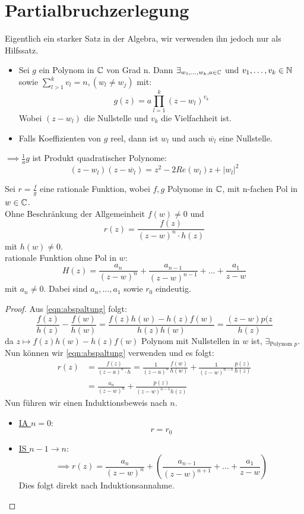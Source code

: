 \section{Partialbruchzerlegung}
\begin{lemma}
Eigentlich ein starker Satz in der Algebra, wir verwenden ihn jedoch nur als Hilfssatz.

\begin{itemize}
	\item Sei $g$ ein Polynom in $\mathbb{C}$  von Grad n. Dann $\exists_{w_1,\ldots,w_k,a \in \mathbb{C}} $ und $v_1,\ldots,v_k \in \mathbb{N}$ sowie $\sum_{l>1}^{k}v_l=n, (w_l \neq w_j)$ mit:
		\[
			g(z) = a \prod_{l=1}^{k} (z-w_l)^{v_k}
		\]
		Wobei $(z-w_l)$ die Nullstelle und $v_k$ die Vielfachheit ist.   
	\item Falls Koeffizienten von $g$ reel, dann ist $w_l$ und auch $\overline{w_l}$ eine Nullstelle. 
\end{itemize}
$\implies \frac{1}{a}g$ ist Produkt quadratischer Polynome:
\[
	(z-w_l)(z-\overline{w_l})= z^2 -2Re(w_l)z + |w_l|^2
\]
\end{lemma}
\begin{lemma}
Sei $r=\frac{f}{g}$ eine rationale Funktion, wobei $f,g$ Polynome in $\mathbb{C}$, mit n-fachen Pol in $w \in \mathbb{C}$.\\
Ohne Beschränkung der Allgemeinheit $f(w)\neq 0$ und
\begin{equation}
	\label{eqn:abspaltung}
	r(z) = \frac{f(z)}{(z-w)^n \cdot h(z)}
\end{equation}
mit $h(w)\neq 0$. \\rationale Funktion ohne Pol in $w$:
\[
	H(z) = \frac{a_n}{(z-w)^n}+ \frac{a_{n-1}}{(z-w)^{n-1}}+\ldots+\frac{a_1}{z-w}
\]
mit $a_n\neq 0$. Dabei sind $a_n,\ldots,a_1$ sowie $r_0$ eindeutig. 
\end{lemma}
\begin{proof}
	Aus \eqref{eqn:abspaltung} folgt:
	\[
	\frac{f(z)}{h(z)}-\frac{f(w)}{h(w)}=\frac{f(z)h(w)-h(z)f(w)}{h(z)h(w)}= \frac{(z-w)p(z}{h(z)}
	\]
	da $z \mapsto f(z)h(w)-h(z)f(w)$ Polynom mit Nullstellen in $w$ ist, $\exists_{\text{Polynom } p}$. 
Nun können wir \eqref{eqn:abspaltung} verwenden und es folgt:
\begin{align*}
	r(z)&= \frac{f(z)}{(z-a)^n \cdot h}= \frac{1}{(z-a)^n}\frac{f(w)}{h(w)}+\frac{1}{(z-w)^{n-1}} \frac{p(z)}{h(z)} \\
	    &=\frac{a_n}{(z-w)^n} + \frac{p(z)}{(z-w)^{n-1}h(z)}
\end{align*}
Nun führen wir einen Induktionsbeweis nach $n$.
\begin{itemize}
	\item \underline{IA $n=0$}:
		\[
		r=r_0
		\]
	\item \underline{IS $n-1 \to n$}:
		\[
			\implies r(z) = \frac{a_n}{(z-w)^n}+ \left( \frac{a_{n-1}}{(z-w)^{n+1}}+\ldots + \frac{a_1}{z-w} \right)
		\]
		Dies folgt direkt nach Induktionsannahme.
\end{itemize}
\end{proof}
